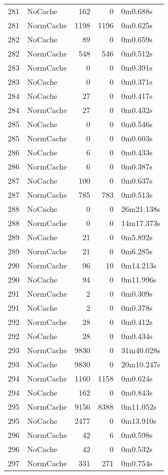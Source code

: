 \begin{tabular}{llrrl}
281 & NoCache & 162 & 0 & 0m0.688s \\
281 & NormCache & 1198 & 1196 & 0m0.625s \\
282 & NoCache & 89 & 0 & 0m0.659s \\
282 & NormCache & 548 & 546 & 0m0.512s \\
283 & NormCache & 0 & 0 & 0m0.391s \\
283 & NoCache & 0 & 0 & 0m0.371s \\
284 & NoCache & 27 & 0 & 0m0.417s \\
284 & NormCache & 27 & 0 & 0m0.432s \\
285 & NoCache & 0 & 0 & 0m0.546s \\
285 & NormCache & 0 & 0 & 0m0.603s \\
286 & NoCache & 6 & 0 & 0m0.433s \\
286 & NormCache & 6 & 0 & 0m0.387s \\
287 & NoCache & 100 & 0 & 0m0.637s \\
287 & NormCache & 785 & 783 & 0m0.513s \\
288 & NoCache & 0 & 0 & 26m21.138s \\
288 & NormCache & 0 & 0 & 14m17.373s \\
289 & NoCache & 21 & 0 & 0m5.892s \\
289 & NormCache & 21 & 0 & 0m6.285s \\
290 & NormCache & 96 & 10 & 0m14.213s \\
290 & NoCache & 94 & 0 & 0m11.996s \\
291 & NormCache & 2 & 0 & 0m0.309s \\
291 & NoCache & 2 & 0 & 0m0.378s \\
292 & NormCache & 28 & 0 & 0m0.412s \\
292 & NoCache & 28 & 0 & 0m0.434s \\
293 & NormCache & 9830 & 0 & 31m40.028s \\
293 & NoCache & 9830 & 0 & 20m10.247s \\
294 & NormCache & 1160 & 1158 & 0m0.624s \\
294 & NoCache & 162 & 0 & 0m0.843s \\
295 & NormCache & 9156 & 8388 & 0m11.052s \\
295 & NoCache & 2477 & 0 & 0m13.910s \\
296 & NormCache & 42 & 6 & 0m0.598s \\
296 & NoCache & 42 & 0 & 0m0.532s \\
297 & NormCache & 331 & 271 & 0m0.754s \\

\end{tabular}
